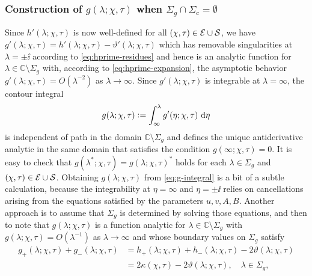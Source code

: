 \subsubsection{Construction of $g(\lambda;\chi,\tau)$ when $\Sigma_g\cap\Sigma_\mathrm{c}=\emptyset$}
\label{sec:g-function-loop}
Since $h'(\lambda;\chi,\tau)$ is now well-defined for all $(\chi,\tau)\in \mathcal{E}\cup\mathcal{S}$, we have $g'(\lambda;\chi,\tau)=h'(\lambda;\chi,\tau)-\vartheta'(\lambda;\chi,\tau)$ which has removable singularities at $\lambda=\pm\ii$ according to \eqref{eq:hprime-residues}
and hence is an analytic function for $\lambda\in\mathbb{C}\setminus\Sigma_g$ with, according to \eqref{eq:hprime-expansion}, the asymptotic behavior $g'(\lambda;\chi,\tau)=O(\lambda^{-2})$ as $\lambda\to\infty$.  Since $g'(\lambda;\chi,\tau)$ is integrable at $\lambda=\infty$, the contour integral
\begin{equation}
g(\lambda;\chi,\tau)\vcentcolon=\int_\infty^\lambda g'(\eta;\chi,\tau)\,\,\mathrm{d}\eta
\label{eq:g-integral}
\end{equation}
is independent of path in the domain $\mathbb{C}\setminus\Sigma_g$ and defines the unique antiderivative analytic in the same domain that satisfies the condition $g(\infty;\chi,\tau)=0$.  It is easy to check that $g(\lambda^*;\chi,\tau)=g(\lambda;\chi,\tau)^*$ holds for each $\lambda\in\Sigma_g$ and $(\chi,\tau)\in \mathcal{E}\cup\mathcal{S}$.  Obtaining $g(\lambda;\chi,\tau)$ from \eqref{eq:g-integral} is a bit of a subtle calculation, because the integrability at $\eta=\infty$ and $\eta=\pm\ii$ relies on cancellations arising from the equations satisfied by the parameters $u,v,A,B$.  Another approach is to assume that $\Sigma_g$ is determined by solving those equations, and then to note that $g(\lambda;\chi,\tau)$ is a function analytic for $\lambda\in\mathbb{C}\setminus\Sigma_g$ with $g(\lambda;\chi,\tau)=O(\lambda^{-1})$ as $\lambda\to\infty$ and whose boundary values on $\Sigma_g$ satisfy 
\begin{equation}
\begin{split}
g_+(\lambda;\chi,\tau)+g_-(\lambda;\chi,\tau)&=h_+(\lambda;\chi,\tau)+h_-(\lambda;\chi,\tau)-2\vartheta(\lambda;\chi,\tau)\\
&=2 \kappa(\chi,\tau)-2\vartheta(\lambda;\chi,\tau),\quad \lambda\in\Sigma_g,
\end{split}
\label{eq:hpm-kappa}
\end{equation}
